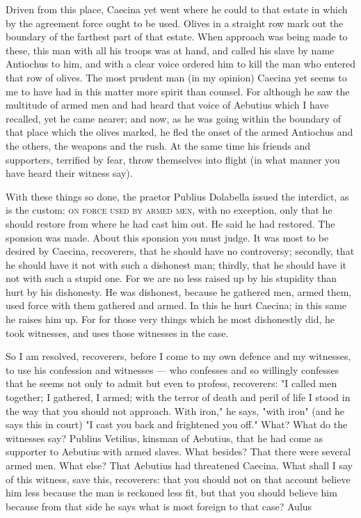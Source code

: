  Driven from this place, Caecina yet went where he could to that estate in which by the agreement force ought to be used. Olives in a straight row mark out the boundary of the farthest part of that estate. When approach was being made to these, this man with all his troops was at hand, and called his slave by name Antiochus to him, and with a clear voice ordered him to kill the man who entered that row of olives. The most prudent man (in my opinion) Caecina yet seems to me to have had in this matter more spirit than counsel. For although he saw the multitude of armed men and had heard that voice of Aebutius which I have recalled, yet he came nearer; and now, as he was going within the boundary of that place which the olives marked, he fled the onset of the armed Antiochus and the others, the weapons and the rush. At the same time his friends and supporters, terrified by fear, throw themselves into flight (in what manner you have heard their witness say).

 With these things so done, the praetor Publius Dolabella issued the interdict, as is the custom: \textsc{on force used by armed men}, with no exception, only that he should restore from where he had cast him out. He said he had restored. The sponsion was made. About this sponsion you must judge. It was most to be desired by Caecina, recoverers, that he should have no controversy; secondly, that he should have it not with such a dishonest man; thirdly, that he should have it not with such a stupid one. For we are no less raised up by his stupidity than hurt by his dishonesty. He was dishonest, because he gathered men, armed them, used force with them gathered and armed. In this he hurt Caecina; in this same he raises him up. For for those very things which he most dishonestly did, he took witnesses, and uses those witnesses in the case.

 So I am resolved, recoverers, before I come to my own defence and my witnesses, to use his confession and witnesses --- who confesses and so willingly confesses that he seems not only to admit but even to profess, recoverers: "I called men together; I gathered, I armed; with the terror of death and peril of life I stood in the way that you should not approach. With iron," he says, "with iron" (and he says this in court) "I cast you back and frightened you off." What? What do the witnesses say? Publius Vetilius, kinsman of Aebutius, that he had come as supporter to Aebutius with armed slaves. What besides? That there were several armed men. What else? That Aebutius had threatened Caecina. What shall I say of this witness, save this, recoverers: that you should not on that account believe him less because the man is reckoned less fit, but that you should believe him because from that side he says what is most foreign to that case? Aulus


